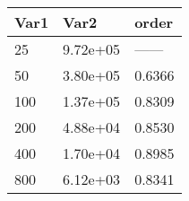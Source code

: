 \begin{tabular}{lll}
Var1 & Var2 & order \\ 
\hline 
25 & 9.72e+05 & ------ \\ 
50 & 3.80e+05 & 0.6366 \\ 
100 & 1.37e+05 & 0.8309 \\ 
200 & 4.88e+04 & 0.8530 \\ 
400 & 1.70e+04 & 0.8985 \\ 
800 & 6.12e+03 & 0.8341 \\ 
\hline 
\end{tabular}